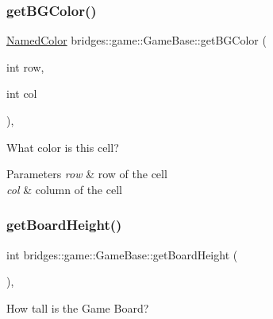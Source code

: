 \mbox{\label{classbridges_1_1game_1_1_game_base_a924f911774a89d18ccb391bb28fd703c}} 
\subsubsection{\texorpdfstring{get\+B\+G\+Color()}{getBGColor()}}
{\footnotesize\ttfamily \hyperlink{namespacebridges_1_1game_afaa832a4322b25b6a4ebfba832f10f26}{Named\+Color} bridges\+::game\+::\+Game\+Base\+::get\+B\+G\+Color (\begin{DoxyParamCaption}\item[{int}]{row,  }\item[{int}]{col }\end{DoxyParamCaption})\hspace{0.3cm}{\ttfamily [inline]}, {\ttfamily [protected]}}



What color is this cell? 


\begin{DoxyParams}{Parameters}
{\em row} & row of the cell \\
\hline
{\em col} & column of the cell \\
\hline
\end{DoxyParams}
\mbox{\label{classbridges_1_1game_1_1_game_base_a14510d6685e0b224c8995e397ad64adc}} 
\subsubsection{\texorpdfstring{get\+Board\+Height()}{getBoardHeight()}}
{\footnotesize\ttfamily int bridges\+::game\+::\+Game\+Base\+::get\+Board\+Height (\begin{DoxyParamCaption}{ }\end{DoxyParamCaption})\hspace{0.3cm}{\ttfamily [inline]}, {\ttfamily [protected]}}



How tall is the Game Board? 


